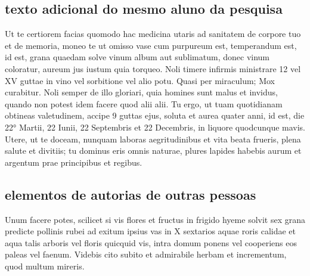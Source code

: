\documentclass[
	12pt,				%
	oneside, %
	a4paper,			%
	english,			%
	brazil				%
	]{abntex2}
\begin{document}
\begin{apendicesenv}

\partapendices
\chapter{texto adicional do mesmo aluno da pesquisa}

Ut te certiorem facias quomodo hac medicina utaris ad sanitatem de corpore tuo et de memoria, moneo te ut omisso vase cum purpureum est, temperandum est, id est, grana quaedam solve vinum album aut sublimatum, donec vinum coloratur, aureum jus iustum quia torqueo. Noli timere infirmis ministrare 12 vel XV guttae in vino vel sorbitione vel alio potu. Quasi per miraculum;
Mox curabitur. Noli semper de illo gloriari, quia homines sunt malus et invidus, quando non potest idem facere quod alii alii. Tu ergo, ut tuam quotidianam obtineas valetudinem, accipe 9 guttas ejus, soluta et aurea quater anni, id est, die 22° Martii, 22 Iunii, 22 Septembris et 22 Decembris, in liquore quodcunque mavis. Utere, ut te doceam, nunquam laboras
aegritudinibus et vita beata frueris, plena salute et divitiis; tu dominus eris omnis naturae, plures lapides habebis aurum et argentum prae principibus et regibus.

\end{apendicesenv}

\begin{anexosenv}

\partanexos

\chapter{elementos de autorias de outras pessoas}
Unum facere potes, scilicet si vis flores et fructus in frigido hyeme solvit sex grana predicte pollinis rubei ad exitum ipsius vas in X sextarios aquae roris calidae et aqua talis arboris vel floris quicquid vis, intra domum ponens vel cooperiens eos paleas vel faenum. Videbis cito subito et admirabile herbam et incrementum, quod multum mireris. 

\end{anexosenv}

\printindex
\end{document}
